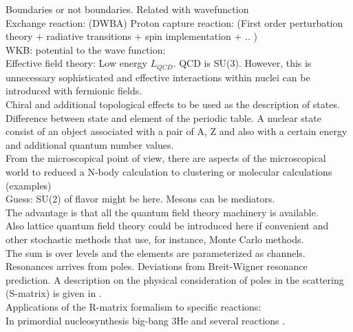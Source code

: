 \documentclass[openany]{book}
\begin{document}
Boundaries or not boundaries. Related with wavefunction  \\

Exchange reaction: (DWBA)
Proton capture reaction: (First order perturbation theory + radiative transitions + spin implementation + .. ) \\

WKB: potential to the wave function: \\

Effective field theory: Low energy $L_{QCD}$. 
QCD is SU(3). However, this is unnecessary sophisticated and effective interactions within nuclei can be introduced with fermionic fields.  \\

Chiral and additional topological effects to be used as the description of states. \\
 
Difference between state and element of the periodic table. A nuclear state consist of an object associated with a pair of A, Z and also  with a certain energy and additional quantum number values. \\

From the microscopical point of view, there are aspects of the microscopical world to reduced a N-body calculation to  clustering or molecular calculations (examples) \\

Guess: SU(2) of flavor might be here. Mesons can be mediators. \\

The advantage is that all the quantum field theory machinery is available. \\

Also lattice quantum field theory could be introduced here if convenient and other stochastic methods that use, for instance, Monte Carlo methods. \\

The sum is over levels and the elements are parameterized as channels.  \\

Resonances arrives from poles. Deviations from Breit-Wigner resonance prediction. A description on the physical consideration of poles in the scattering (S-matrix) is given in \cite{ramirezjimenez_kelkar_2018}. \\

Applications of the R-matrix formalism to specific reactions: \\

In primordial nucleosynthesis \cite{desouza_iliadis_coc_2019} big-bang 3He and several reactions \cite{sparta_pizzone_bertulani_hou_lamia_tumino_2020}. \\
\end{document}
